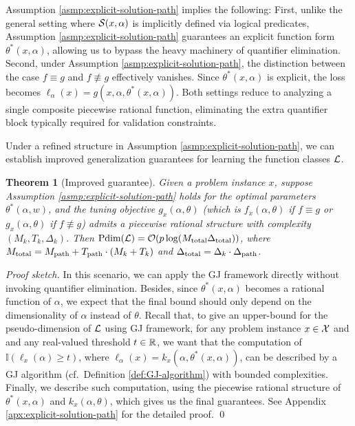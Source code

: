 \documentclass{article}
\theoremstyle{plain}
\newtheorem{theorem}{Theorem}[section]
\theoremstyle{definition}
\theoremstyle{remark}
\begin{document}
Assumption \ref{asmp:explicit-solution-path} implies the following: First, unlike the general setting where $\mathcal{S}(x, \alpha)$ is implicitly defined via logical predicates, Assumption \ref{asmp:explicit-solution-path} guarantees an explicit function form $\theta^*(x, \alpha)$, allowing us to bypass the heavy machinery of quantifier elimination. 
Second, under Assumption \ref{asmp:explicit-solution-path}, the distinction between the case $f \equiv g$ and $f \not \equiv g$ effectively vanishes. Since $\theta^*(x, \alpha)$ is explicit, the loss becomes $\ell_\alpha(x) = g(x, \alpha, \theta^*(x, \alpha))$. Both settings reduce to analyzing a single composite piecewise rational function, eliminating the extra quantifier block typically required for validation constraints. 

Under a refined structure in Assumption \ref{asmp:explicit-solution-path}, we can establish improved generalization guarantees for learning the function classes $\mathcal{L}$.

\begin{theorem}[Improved guarantee] \label{thm:explicit-solution-path-guarantee}
    Given a problem instance $x$, suppose Assumption \ref{asmp:explicit-solution-path} holds for the optimal parameters $\theta^*(\alpha, w)$, and the tuning objective $g_x(\alpha, \theta)$ (which is $f_x(\alpha, \theta)$ if $f \equiv g$ or $g_x(\alpha, \theta)$ if $f \not \equiv g$) admits a piecewise rational structure with complexity $(M_k, T_k, \Delta_k)$. Then $\text{\normalfont Pdim}(\mathcal{L}) = \mathcal{O}(p \log (M_\textup{total}\Delta_\textup{total}))$, where $M_\textup{total} = M_\textup{path} + T_\textup{path}\cdot (M_k + T_k)$ and $\Delta_\textup{total} = \Delta_k \cdot \Delta_\textup{path}$.
\end{theorem}
\noindent \textit{Proof sketch.}
    In this scenario, we can apply the GJ framework directly without invoking quantifier elimination. Besides, since $\theta^*(x, \alpha)$ becomes a rational function of $\alpha$, we expect that the final bound should only depend on the dimensionality of $\alpha$ instead of $\theta$. Recall that, to give an upper-bound for the pseudo-dimension of $\mathcal{L}$ using GJ framework, for any problem instance $x \in \mathcal{X}$ and and any real-valued threshold $t \in \mathbb{R}$, we want that the computation of $\mathbb{I}(\ell_x(\alpha) \geq t)$, where $\ell_\alpha(x) = k_x(\alpha, \theta^*(x, \alpha))$, can be described by a GJ algorithm (cf.~Definition \ref{def:GJ-algorithm}) with bounded complexities. Finally, we describe such computation, using the piecewise rational structure of $\theta^*(x, \alpha)$ and $k_x(\alpha, \theta)$, which gives us the final guarantees. See Appendix \ref{apx:explicit-solution-path} for the detailed proof. 
\qed
\end{document}
